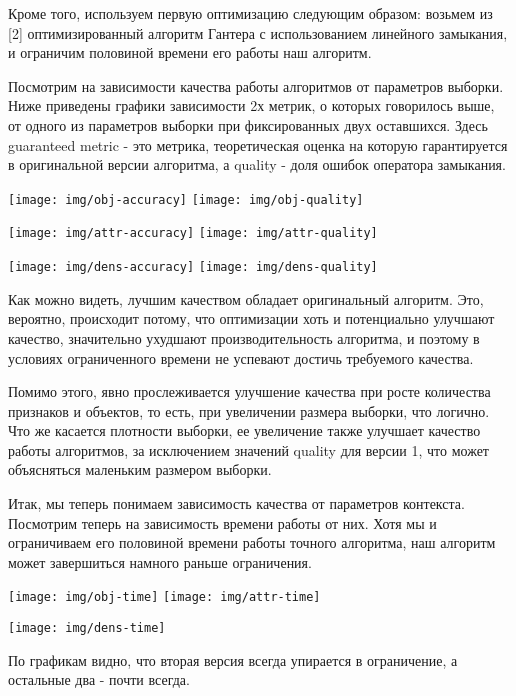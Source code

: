 Кроме того, используем первую оптимизацию следующим образом: возьмем из [2] оптимизированный алгоритм Гантера с использованием линейного замыкания, и ограничим половиной времени его работы наш алгоритм.

Посмотрим на зависимости качества работы алгоритмов от параметров выборки. Ниже приведены графики зависимости 2х метрик, о которых говорилось выше, от одного из параметров выборки при фиксированных двух оставшихся. Здесь guaranteed metric - это метрика, теоретическая оценка на которую гарантируется в оригинальной версии алгоритма, а quality - доля ошибок оператора замыкания.

\texttt{[image: img/obj-accuracy]}
\texttt{[image: img/obj-quality]}

\texttt{[image: img/attr-accuracy]}
\texttt{[image: img/attr-quality]}

\texttt{[image: img/dens-accuracy]}
\texttt{[image: img/dens-quality]}

Как можно видеть, лучшим качеством обладает оригинальный алгоритм. Это, вероятно, происходит потому, что оптимизации хоть и потенциально улучшают качество, значительно ухудшают производительность алгоритма, и поэтому в условиях ограниченного времени не успевают достичь требуемого качества.

Помимо этого, явно прослеживается улучшение качества при росте количества признаков и объектов, то есть, при увеличении размера выборки, что логично. Что же касается плотности выборки, ее увеличение также улучшает качество работы алгоритмов, за исключением значений quality для версии 1, что может объясняться маленьким размером выборки.

Итак, мы теперь понимаем зависимость качества от параметров контекста. Посмотрим теперь на зависимость времени работы от них. Хотя мы и ограничиваем его половиной времени работы точного алгоритма, наш алгоритм может завершиться намного раньше ограничения.

\texttt{[image: img/obj-time]}
\texttt{[image: img/attr-time]}

\texttt{[image: img/dens-time]}

По графикам видно, что вторая версия всегда упирается в ограничение, а остальные два - почти всегда. %

